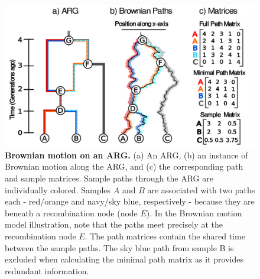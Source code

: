 \begin{figure}[H]
    \includegraphics[width=\linewidth]{Images/Figure1_Method/Fig1_Method_Simplified.png}
    \caption{\textbf{Brownian motion on an ARG.} (a) An ARG, (b) an instance of Brownian motion along the ARG, and (c) the corresponding path and sample matrices. Sample paths through the ARG are individually colored. Samples $A$ and $B$ are associated with two paths each - red/orange and navy/sky blue, respectively - because they are beneath a recombination node (node $E$). In the Brownian motion model illustration, note that the paths meet precisely at the recombination node $E$. The path matrices contain the shared time between the sample paths. The sky blue path from sample B is excluded when calculating the minimal path matrix as it provides redundant information.}%
    \label{fig:method}
\end{figure}



